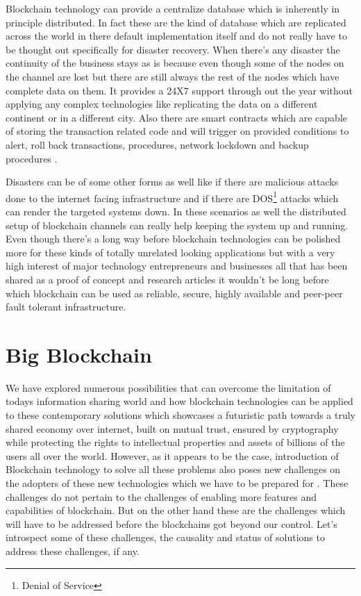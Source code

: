 Blockchain technology can provide a centralize database which is inherently in principle distributed. In fact these are the kind of database which are replicated across the world in there default implementation itself and do not really have to be thought out specifically for disaster recovery. When there's any disaster the continuity of the business stays as is because even though some of the nodes on the channel are lost but there are still always the rest of the nodes which have complete data on them. It provides a 24X7 support through out the year  without applying any complex technologies like replicating the data on a different continent or in a different city. Also there are smart contracts which are capable of storing the transaction related code and will trigger on provided conditions to alert, roll back transactions, procedures, network lockdown and backup procedures \cite{elmer7}.

Disasters can be of some other forms as well like if there are malicious attacks done to the internet facing infrastructure and if there are DOS\footnote{Denial of Service} attacks which can render the targeted systems down. In these scenarios as well the distributed setup of blockchain channels can really help keeping the system up and running. Even though there's a long way before blockchain technologies can be polished more for these kinds of totally unrelated looking applications but with a very high interest of major technology entrepreneurs and businesses all that has been shared as a proof of concept and research articles it wouldn't be long before which blockchain can be used as reliable, secure, highly available and peer-peer fault tolerant infrastructure.


\section{Big Blockchain}
We have explored numerous possibilities that can overcome the limitation of todays information sharing world and how blockchain technologies can be applied to these contemporary solutions which showcases a futuristic path towards a truly shared economy over internet, built on mutual trust, ensured by cryptography while protecting the rights to intellectual properties and assets of billions of the users all over the world. However, as it appears to be the case, introduction of Blockchain technology to solve all these problems also poses new challenges on the adopters of these new technologies which we have to be prepared for \cite{smith31}. These challenges do not pertain to the challenges of enabling more features and capabilities of blockchain. But on the other hand these are the challenges which will have to be addressed before the blockchains got beyond our control. Let's introspect some of these challenges, the causality and status of solutions to address these challenges, if any.

